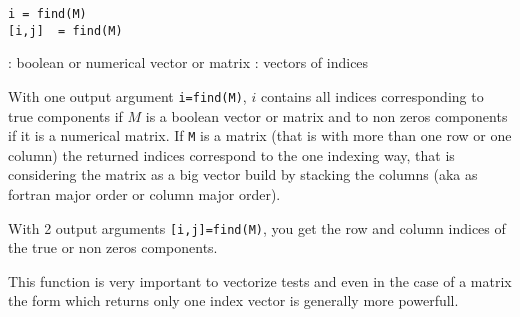 
\begin{mandesc}
\end{mandesc}

\begin{calling_sequence}
\begin{verbatim}
i = find(M)
[i,j]  = find(M)
\end{verbatim}
\end{calling_sequence}
\begin{parameters}
  \begin{varlist}
    :  boolean or  numerical vector or matrix
    : vectors of indices
  \end{varlist}
\end{parameters}

\begin{mandescription}
With one output argument \verb+i=find(M)+,  $i$ contains all indices 
corresponding to true components if $M$ is a boolean vector or matrix 
and to non zeros components if it is a numerical matrix. If \verb+M+
is a matrix (that is with more than one row or one
column) the returned indices correspond to the one indexing way, 
that is considering the matrix as a big vector build by stacking 
the columns (aka as fortran major order or column major order).

With 2 output arguments \verb+[i,j]=find(M)+,
you get the  row and column indices of the true or non zeros components.
 
This function is very important to vectorize tests and even in the 
case of a matrix the form which returns only one 
index vector is generally more powerfull.
\end{mandescription}

